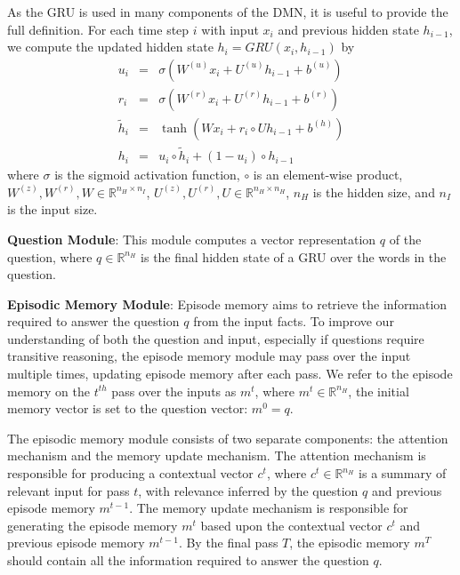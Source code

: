 \documentclass{article}
\begin{document}
As the GRU is used in many components of the DMN, it is useful to provide the full definition.
For each time step $i$ with input $x_i$ and previous hidden state $h_{i-1}$, we compute the updated hidden state $h_i = GRU(x_i,h_{i-1})$ by
\begin{eqnarray}
u_i &=& \sigma\left(W^{(u)}x_{i} + U^{(u)} h_{i-1}  + b^{(u)} \right)\label{eq:gru-update}\\
r_i &=& \sigma\left(W^{(r)}x_{i} + U^{(r)} h_{i-1} + b^{(r)} \right)\\
\tilde{h}_i &=&  \tanh\left(Wx_{i} + r_i \circ U h_{i-1}  + b^{(h)}\right)\\
h_i &=&  u_i\circ \tilde{h}_i + (1-u_i) \circ h_{i-1}\label{eq:gru-hidden}
\end{eqnarray}
where $\sigma$ is the sigmoid activation function, $\circ$ is an element-wise product, $W^{(z)}, W^{(r)}, W \in \mathbb{R}^{n_H \times n_I}$, $U^{(z)}, U^{(r)}, U \in \mathbb{R}^{n_H \times n_H}$, $n_H$ is the hidden size, and $n_I$ is the input size.



\textbf{Question Module}:
This module computes a vector representation $q$ of the question, where $q \in \mathbb{R}^{n_H}$ is the final hidden state of a GRU over the words in the question.


\textbf{Episodic Memory Module}:
Episode memory aims to retrieve the information required to answer the question $q$ from the input facts.
To improve our understanding of both the question and input, especially if questions require transitive reasoning, the episode memory module may pass over the input multiple times, updating episode memory after each pass.
We refer to the episode memory on the $t^{th}$ pass over the inputs as $m^t$, where $m^t \in \mathbb{R}^{n_H}$, the initial memory vector is set to the question vector: $m^0 = q$.


The episodic memory module consists of two separate components: the attention mechanism and the memory update mechanism.
The attention mechanism is responsible for producing a contextual vector $c^t$, where $c^t \in \mathbb{R}^{n_H}$ is a summary of relevant input for pass $t$, with relevance inferred by the question $q$ and previous episode memory $m^{t-1}$.
The memory update mechanism is responsible for generating the episode memory $m^t$ based upon the contextual vector $c^t$ and previous episode memory $m^{t-1}$.
By the final pass $T$, the episodic memory $m^T$ should contain all the information required to answer the question $q$.
\end{document}
